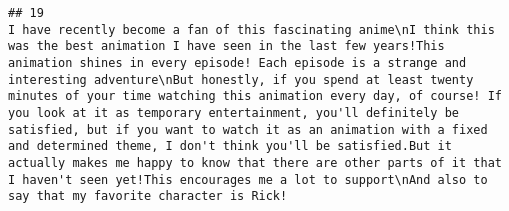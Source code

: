 \documentclass[
]{article}
\begin{document}
\begin{verbatim}
## 19                                                                                                                                                                                                                                                                                                                                                                                                                                                                                                                                                                                                                                                                                                                                                                                                                                                                                                                                                                                                                                                                                                                                                                                                                                                                                                                                                                                                                                                                                                                                                                                                                                                                                                                    I have recently become a fan of this fascinating anime\nI think this was the best animation I have seen in the last few years!This animation shines in every episode! Each episode is a strange and interesting adventure\nBut honestly, if you spend at least twenty minutes of your time watching this animation every day, of course! If you look at it as temporary entertainment, you'll definitely be satisfied, but if you want to watch it as an animation with a fixed and determined theme, I don't think you'll be satisfied.But it actually makes me happy to know that there are other parts of it that I haven't seen yet!This encourages me a lot to support\nAnd also to say that my favorite character is Rick!

\end{verbatim}
\end{document}
